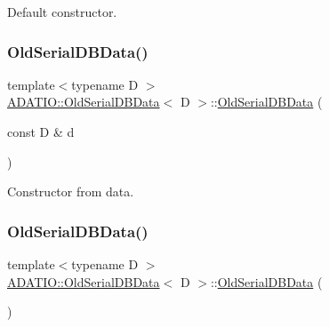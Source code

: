 Default constructor. 

\mbox{\label{classADATIO_1_1OldSerialDBData_ada293b92b5081fbb6e82364196ff5524}} 
\subsubsection{\texorpdfstring{OldSerialDBData()}{OldSerialDBData()}\hspace{0.1cm}{\footnotesize\ttfamily [4/6]}}
{\footnotesize\ttfamily template$<$typename D $>$ \\
\mbox{\hyperlink{classADATIO_1_1OldSerialDBData}{A\+D\+A\+T\+I\+O\+::\+Old\+Serial\+D\+B\+Data}}$<$ D $>$\+::\mbox{\hyperlink{classADATIO_1_1OldSerialDBData}{Old\+Serial\+D\+B\+Data}} (\begin{DoxyParamCaption}\item[{const D \&}]{d }\end{DoxyParamCaption})\hspace{0.3cm}{\ttfamily [inline]}}



Constructor from data. 

\mbox{\label{classADATIO_1_1OldSerialDBData_a189c0c4ac35db492b9cbc68deb15c5dd}} 
\subsubsection{\texorpdfstring{OldSerialDBData()}{OldSerialDBData()}\hspace{0.1cm}{\footnotesize\ttfamily [5/6]}}
{\footnotesize\ttfamily template$<$typename D $>$ \\
\mbox{\hyperlink{classADATIO_1_1OldSerialDBData}{A\+D\+A\+T\+I\+O\+::\+Old\+Serial\+D\+B\+Data}}$<$ D $>$\+::\mbox{\hyperlink{classADATIO_1_1OldSerialDBData}{Old\+Serial\+D\+B\+Data}} (\begin{DoxyParamCaption}{ }\end{DoxyParamCaption})\hspace{0.3cm}{\ttfamily [inline]}}



